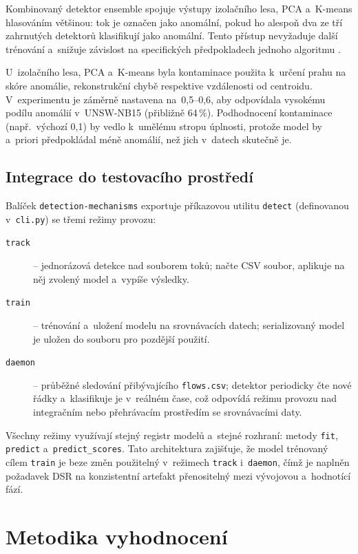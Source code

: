 Kombinovaný detektor ensemble spojuje výstupy izolačního lesa, PCA a~K-means hlasováním většinou: tok je označen jako anomální, pokud ho alespoň dva ze tří zahrnutých detektorů klasifikují jako anomální. Tento přístup nevyžaduje další trénování a~snižuje závislost na specifických předpokladech jednoho algoritmu \parencite{OzkanOkay2021}.

U~izolačního lesa, PCA a~K-means byla kontaminace použita k~určení prahu na skóre anomálie, rekonstrukční chybě respektive vzdálenosti od centroidu. V~experimentu je záměrně nastavena na~0{,}5--0{,}6, aby odpovídala vysokému podílu anomálií v~UNSW-NB15 (přibližně 64\,\%). Podhodnocení kontaminace (např.~výchozí 0{,}1) by vedlo k~umělému stropu úplnosti, protože model by a~priori předpokládal méně anomálií, než jich v~datech skutečně je.

\subsection{Integrace do testovacího prostředí}
\label{sec:integrace}

Balíček \texttt{detection-mechanisms} exportuje příkazovou utilitu \texttt{detect} (definovanou v~\texttt{cli.py}) se třemi režimy provozu:

\begin{description}
\item[\texttt{track}] -- jednorázová detekce nad souborem toků; načte CSV soubor, aplikuje na něj zvolený model a~vypíše výsledky.
\item[\texttt{train}] -- trénování a~uložení modelu na srovnávacích datech; serializovaný model je uložen do souboru pro pozdější použití.
\item[\texttt{daemon}] -- průběžné sledování přibývajícího \texttt{flows.csv}; detektor periodicky čte nové řádky a~klasifikuje je v~reálném čase, což odpovídá režimu provozu nad integračním nebo přehrávacím prostředím se srovnávacími daty.
\end{description}

Všechny režimy využívají stejný registr modelů a~stejné rozhraní: metody \texttt{fit}, \texttt{predict} a~\texttt{predict\_scores}.
Tato architektura zajišťuje, že model trénovaný cílem \texttt{train} je beze změn použitelný v~režimech \texttt{track} i~\texttt{daemon}, čímž je naplněn požadavek DSR na konzistentní artefakt přenositelný mezi vývojovou a~hodnotící fází.

\section{Metodika vyhodnocení}
\label{sec:metodika-vyhodnoceni}

